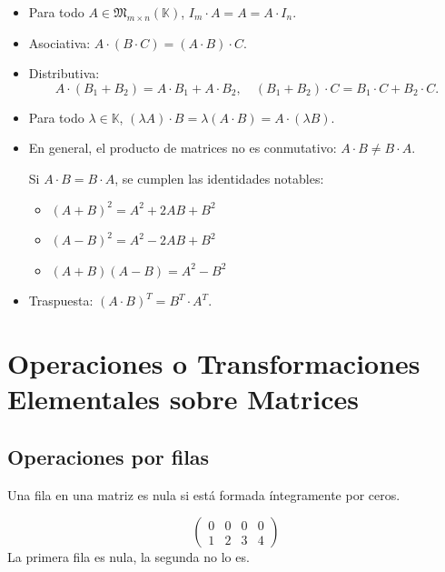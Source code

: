 \documentclass[a4paper,12pt]{article}
\begin{document}
\begin{procedimiento}[title=Propiedades del producto de matrices]
\begin{itemize}
\item Para todo $A \in \mathfrak{M}_{m \times n}(\mathbb{K})$, $I_m \cdot A = A = A \cdot I_n$.
\item Asociativa: $A \cdot (B \cdot C) = (A \cdot B) \cdot C$.
\item Distributiva: 
\[
A \cdot (B_1 + B_2) = A \cdot B_1 + A \cdot B_2, \quad 
(B_1 + B_2) \cdot C = B_1 \cdot C + B_2 \cdot C.
\]
\item Para todo $\lambda \in \mathbb{K}$, $(\lambda A) \cdot B = \lambda (A \cdot B) = A \cdot (\lambda B)$.
\item En general, el producto de matrices no es conmutativo: $A \cdot B \neq B \cdot A$.

Si $A \cdot B = B \cdot A$, se cumplen las identidades notables:
\begin{itemize}
\item $(A + B)^2 = A^2 + 2AB + B^2$
\item $(A - B)^2 = A^2 - 2AB + B^2$
\item $(A + B)(A - B) = A^2 - B^2$
\end{itemize}
\item Traspuesta: $(A \cdot B)^T = B^T \cdot A^T$.
\end{itemize}
\end{procedimiento}

\section{Operaciones o Transformaciones Elementales sobre Matrices}

\subsection{Operaciones por filas}

\begin{procedimiento}[title=Fila nula]
Una fila en una matriz es nula si está formada íntegramente por ceros.
\end{procedimiento}

\begin{ejemplo}[title=Ejemplo de fila nula]
\[
\begin{pmatrix}
0 & 0 & 0 & 0 \\
1 & 2 & 3 & 4
\end{pmatrix}
\]
La primera fila es nula, la segunda no lo es.
\end{ejemplo}
\end{document}
